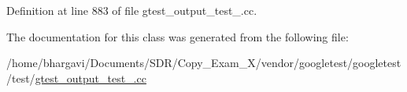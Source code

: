 Definition at line 883 of file gtest\+\_\+output\+\_\+test\+\_\+.\+cc.



The documentation for this class was generated from the following file\+:\begin{DoxyCompactItemize}
\item 
/home/bhargavi/\+Documents/\+S\+D\+R/\+Copy\+\_\+\+Exam\+\_\+X/vendor/googletest/googletest/test/\hyperlink{gtest__output__test___8cc}{gtest\+\_\+output\+\_\+test\+\_\+.\+cc}\end{DoxyCompactItemize}
